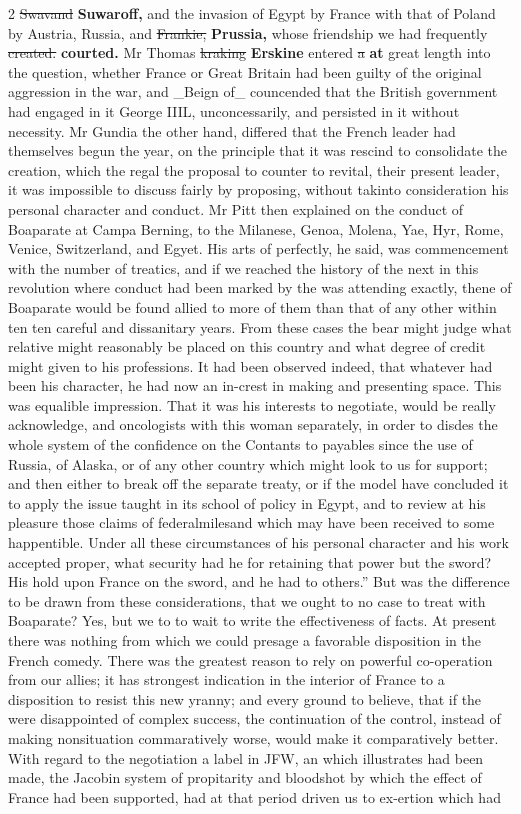 \documentclass[10pt]{article}
\begin{document}
\begin{multicols}{2}
\sout{Swavand} \textbf{Suwaroff,} and the invasion of Egypt by France with that of Poland by Austria, Russia, and \sout{Frankie,} \textbf{Prussia,} whose friendship we had frequently \sout{created.} \textbf{courted.} Mr Thomas \sout{kraking} \textbf{Erskine} entered \sout{a} \textbf{at} great length into the question, whether France or Great Britain had been guilty of the original aggression in the war, and \_Beign of\_ councended that the British government had engaged in it George IIIL, unconcessarily, and persisted in it without necessity. Mr Gundia the other hand, differed that the French leader had themselves begun the year, on the principle that it was rescind to consolidate the creation, which the regal the proposal to counter to revital, their present leader, it was impossible to discuss fairly by proposing, without takinto consideration his personal character and conduct. Mr Pitt then explained on the conduct of Boaparate at Campa Berning, to the Milanese, Genoa, Molena, Yae, Hyr, Rome, Venice, Switzerland, and Egyet. His arts of perfectly, he said, was commencement with the number of treatics, and if we reached the history of the next in this revolution where conduct had been marked by the was attending exactly, thene of Boaparate would be found allied to more of them than that of any other within ten ten careful and dissanitary years. From these cases the bear might judge what relative might reasonably be placed on this country and what degree of credit might given to his professions. It had been observed indeed, that whatever had been his character, he had now an in-crest in making and presenting space. This was equalible impression. That it was his interests to negotiate, would be really acknowledge, and oncologists with this woman separately, in order to disdes the whole system of the confidence on the Contants to payables since the use of Russia, of Alaska, or of any other country which might look to us for support; and then either to break off the separate treaty, or if the model have concluded it to apply the issue taught in its school of policy in Egypt, and to review at his pleasure those claims of federalmilesand which may have been received to some happentible. Under all these circumstances of his personal character and his work accepted proper, what security had he for retaining that power but the sword? His hold upon France on the sword, and he had to others.” But was the difference to be drawn from these considerations, that we ought to no case to treat with Boaparate? Yes, but we to to wait to write the effectiveness of facts. At present there was nothing from which we could presage a favorable disposition in the French comedy. There was the greatest reason to rely on powerful co-operation from our allies; it has strongest indication in the interior of France to a disposition to resist this new yranny; and every ground to believe, that if the were disappointed of complex success, the continuation of the control, instead of making nonsituation commaratively worse, would make it comparatively better. With regard to the negotiation a label in JFW, an which illustrates had been made, the Jacobin system of propitarity and bloodshot by which the effect of France had been supported, had at that period driven us to ex-ertion which had 
\end{multicols}
\end{document}
